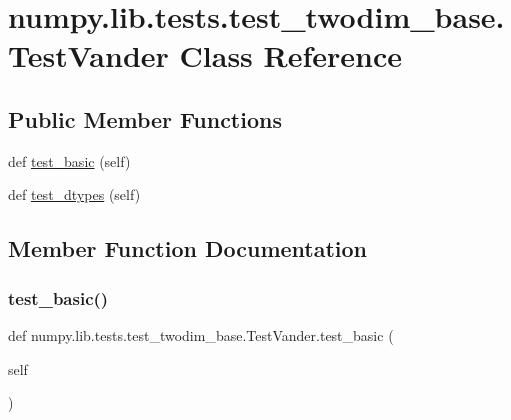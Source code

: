 \hypertarget{classnumpy_1_1lib_1_1tests_1_1test__twodim__base_1_1TestVander}{}\section{numpy.\+lib.\+tests.\+test\+\_\+twodim\+\_\+base.\+Test\+Vander Class Reference}
\label{classnumpy_1_1lib_1_1tests_1_1test__twodim__base_1_1TestVander}
\subsection*{Public Member Functions}
\begin{DoxyCompactItemize}
\item 
def \hyperlink{classnumpy_1_1lib_1_1tests_1_1test__twodim__base_1_1TestVander_ac814eba8c8465423d6bbb94fdf96b436}{test\+\_\+basic} (self)
\item 
def \hyperlink{classnumpy_1_1lib_1_1tests_1_1test__twodim__base_1_1TestVander_a9a981a86f0b14349545210baac697a26}{test\+\_\+dtypes} (self)
\end{DoxyCompactItemize}


\subsection{Member Function Documentation}
\mbox{\label{classnumpy_1_1lib_1_1tests_1_1test__twodim__base_1_1TestVander_ac814eba8c8465423d6bbb94fdf96b436}} 
\subsubsection{\texorpdfstring{test\+\_\+basic()}{test\_basic()}}
{\footnotesize\ttfamily def numpy.\+lib.\+tests.\+test\+\_\+twodim\+\_\+base.\+Test\+Vander.\+test\+\_\+basic (\begin{DoxyParamCaption}\item[{}]{self }\end{DoxyParamCaption})}

